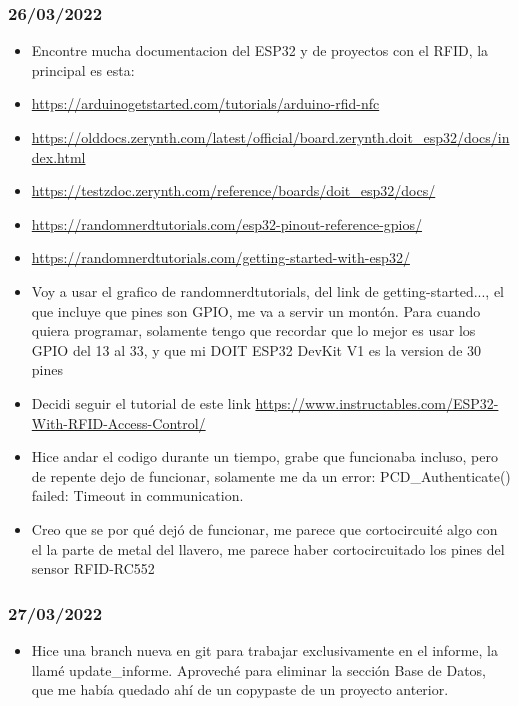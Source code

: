 \documentclass[../informe_krapp.tex]{subfiles}
\begin{document}
\subsubsection{26/03/2022}
\begin{itemize}
	\item Encontre mucha documentacion del ESP32 y de proyectos con el RFID, la principal es esta:
	\item \url{https://arduinogetstarted.com/tutorials/arduino-rfid-nfc}
	\item \url{https://olddocs.zerynth.com/latest/official/board.zerynth.doit_esp32/docs/index.html}
	\item \url{https://testzdoc.zerynth.com/reference/boards/doit_esp32/docs/}
	\item \url{https://randomnerdtutorials.com/esp32-pinout-reference-gpios/}
	\item \url{https://randomnerdtutorials.com/getting-started-with-esp32/}
	\item Voy a usar el grafico de randomnerdtutorials, del link de getting-started...,
	      el que incluye que pines son GPIO, me va a servir un montón.
	      Para cuando quiera programar, solamente tengo que recordar que lo mejor es usar los
	      GPIO del 13 al 33, y que mi DOIT ESP32 DevKit V1 es la version de 30 pines
	\item Decidi seguir el tutorial de este link
	      \url{https://www.instructables.com/ESP32-With-RFID-Access-Control/}
	\item Hice andar el codigo durante un tiempo, grabe que funcionaba incluso, pero de
	      repente dejo de funcionar, solamente me da un error:
	      PCD\_Authenticate() failed: Timeout in communication.
	\item Creo que se por qué dejó de funcionar, me parece que cortocircuité algo
	      con el la parte de metal del llavero, me parece haber cortocircuitado
	      los pines del sensor RFID-RC552
\end{itemize}

\subsubsection{27/03/2022}
\begin{itemize}
	\item Hice una branch nueva en git para trabajar exclusivamente en el informe,
	      la llamé update\_informe.
	      Aproveché para eliminar la sección Base de Datos, que me había quedado ahí
	      de un copypaste de un proyecto anterior.
\end{itemize}
\end{document}
